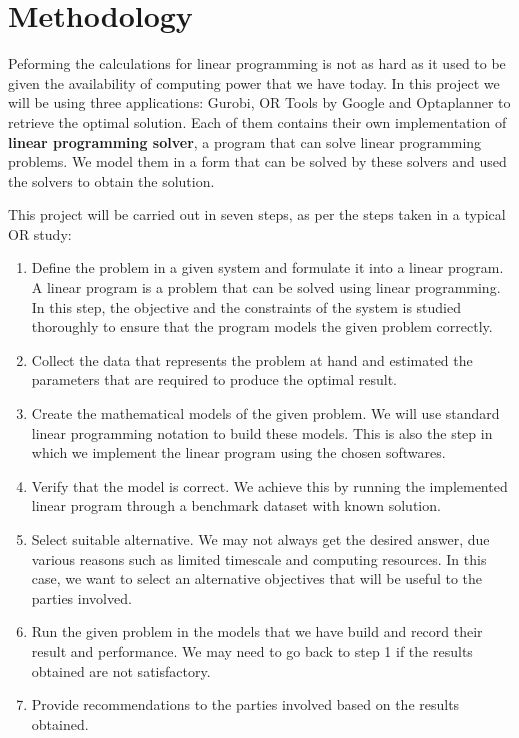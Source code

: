 \section{Methodology}
Peforming the calculations for linear programming is not as hard as it used to be given the availability of computing power that we have today.
In this project we will be using three applications: Gurobi, OR Tools by Google and Optaplanner to retrieve the optimal solution. Each of them
contains their own implementation of \textbf{linear programming solver}, a program that can solve linear programming problems. We model them
in a form that can be solved by these solvers and used the solvers to obtain the solution.

This project will be carried out in seven steps, as per the steps taken in a typical OR study:

\begin{enumerate}
\item Define the problem in a given system and formulate it into a linear program. A linear program is a problem that can be solved
using linear programming. In this step, the objective and the constraints of the system is studied thoroughly to ensure
that the program models the given problem correctly.
\item Collect the data that represents the problem at hand and estimated the parameters that are required to produce
the optimal result.
\item Create the mathematical models of the given problem. We will use standard linear programming notation to build these models. This is
also the step in which we implement the linear program using the chosen softwares.
\item Verify that the model is correct. We achieve this by running the implemented linear program through a benchmark dataset with known solution.
\item Select suitable alternative. We may not always get the desired answer, due various reasons such as limited timescale and computing resources.
In this case, we want to select an alternative objectives that will be useful to the parties involved.
\item Run the given problem in the models that we have build and record their result and performance. We may need to go back to step 1 if the results obtained
are not satisfactory.
\item Provide recommendations to the parties involved based on the results obtained.
\end{enumerate}

